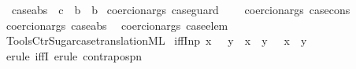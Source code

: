 \begin{isabellebody}
\ \ case{\isacharunderscore}{\kern0pt}abs\ {\isacharcolon}{\kern0pt}{\isacharcolon}{\kern0pt}\ {\isachardoublequoteopen}{\isacharparenleft}{\kern0pt}{\isacharprime}{\kern0pt}c\ {\isasymRightarrow}\ {\isacharprime}{\kern0pt}b{\isacharparenright}{\kern0pt}\ {\isasymRightarrow}\ {\isacharprime}{\kern0pt}b{\isachardoublequoteclose}\isanewline
\isanewline
{}\isamarkupfalse%
\ {\isacharbrackleft}{\kern0pt}{\isacharbrackleft}{\kern0pt}coercion{\isacharunderscore}{\kern0pt}args\ case{\isacharunderscore}{\kern0pt}guard\ {\isacharminus}{\kern0pt}\ {\isacharplus}{\kern0pt}\ {\isacharminus}{\kern0pt}{\isacharbrackright}{\kern0pt}{\isacharbrackright}{\kern0pt}\isanewline
{}\isamarkupfalse%
\ {\isacharbrackleft}{\kern0pt}{\isacharbrackleft}{\kern0pt}coercion{\isacharunderscore}{\kern0pt}args\ case{\isacharunderscore}{\kern0pt}cons\ {\isacharminus}{\kern0pt}\ {\isacharminus}{\kern0pt}{\isacharbrackright}{\kern0pt}{\isacharbrackright}{\kern0pt}\isanewline
{}\isamarkupfalse%
\ {\isacharbrackleft}{\kern0pt}{\isacharbrackleft}{\kern0pt}coercion{\isacharunderscore}{\kern0pt}args\ case{\isacharunderscore}{\kern0pt}abs\ {\isacharminus}{\kern0pt}{\isacharbrackright}{\kern0pt}{\isacharbrackright}{\kern0pt}\isanewline
{}\isamarkupfalse%
\ {\isacharbrackleft}{\kern0pt}{\isacharbrackleft}{\kern0pt}coercion{\isacharunderscore}{\kern0pt}args\ case{\isacharunderscore}{\kern0pt}elem\ {\isacharminus}{\kern0pt}\ {\isacharplus}{\kern0pt}{\isacharbrackright}{\kern0pt}{\isacharbrackright}{\kern0pt}\isanewline
%
\isadelimML
\isanewline
%
\endisadelimML
%
\isatagML
{}\isamarkupfalse%
\ {\isacartoucheopen}Tools{\isacharslash}{\kern0pt}Ctr{\isacharunderscore}{\kern0pt}Sugar{\isacharslash}{\kern0pt}case{\isacharunderscore}{\kern0pt}translation{\isachardot}{\kern0pt}ML{\isacartoucheclose}%
\endisatagML
{\isafoldML}%
%
\isadelimML
\isanewline
%
\endisadelimML
\isanewline
{}\isamarkupfalse%
\ iffI{\isacharunderscore}{\kern0pt}np{\isacharcolon}{\kern0pt}\ {\isachardoublequoteopen}{\isasymlbrakk}x\ {\isasymLongrightarrow}\ {\isasymnot}\ y{\isacharsemicolon}{\kern0pt}\ {\isasymnot}\ x\ {\isasymLongrightarrow}\ y{\isasymrbrakk}\ {\isasymLongrightarrow}\ {\isasymnot}\ x\ {\isasymlongleftrightarrow}\ y{\isachardoublequoteclose}\isanewline
%
\isadelimproof
\ \ %
\endisadelimproof
%
\isatagproof
{}\isamarkupfalse%
\ {\isacharparenleft}{\kern0pt}erule\ iffI{\isacharparenright}{\kern0pt}\ {\isacharparenleft}{\kern0pt}erule\ contrapos{\isacharunderscore}{\kern0pt}pn{\isacharparenright}{\kern0pt}%

\end{isabellebody}
